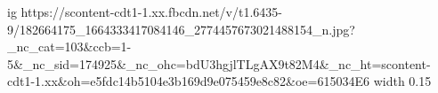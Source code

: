  
 
 
 
 

\par
\ifcmt
  ig https://scontent-cdt1-1.xx.fbcdn.net/v/t1.6435-9/182664175_1664333417084146_2774457673021488154_n.jpg?_nc_cat=103&ccb=1-5&_nc_sid=174925&_nc_ohc=bdU3hgjlTLgAX9t82M4&_nc_ht=scontent-cdt1-1.xx&oh=e5fdc14b5104e3b169d9e075459e8c82&oe=615034E6
  width 0.15
\fi

